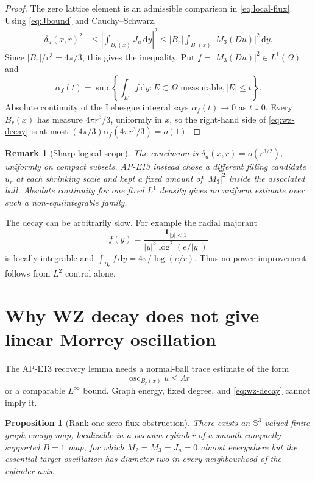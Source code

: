 \documentclass[11pt]{article}
\newtheorem{proposition}[theorem]{Proposition}
\newtheorem{remark}[theorem]{Remark}
\newcommand{\dd}{\,\mathrm d}
\newcommand{\SSS}{\mathbb S}
\newcommand{\osc}{\operatorname{osc}}
\begin{document}
\begin{proof}
The zero lattice element is an admissible comparison in \eqref{eq:local-flux}.
Using \eqref{eq:Jbound} and Cauchy--Schwarz,
\begin{align}
 \delta_u(x,r)^2
 &\leq\left|\int_{B_r(x)}J_u\dd y\right|^2
 \leq |B_r|\int_{B_r(x)}|M_3(Du)|^2\dd y.       \label{eq:wz-cs}
\end{align}
Since $|B_r|/r^3=4\pi/3$, this gives the inequality.  Put
$f=|M_3(Du)|^2\in L^1(\Omega)$ and
\[
 \alpha_f(t)=\sup\left\{\int_E f\dd y:E\subset\Omega\text{ measurable},
 |E|\leq t\right\}.
\]
Absolute continuity of the Lebesgue integral says $\alpha_f(t)\to0$ as
$t\downarrow0$.  Every $B_r(x)$ has measure $4\pi r^3/3$, uniformly in $x$,
so the right-hand side of \eqref{eq:wz-decay} is at most
$(4\pi/3)\alpha_f(4\pi r^3/3)=o(1)$.
\end{proof}

\begin{remark}[Sharp logical scope]
The conclusion is $\delta_u(x,r)=o(r^{3/2})$, uniformly on compact subsets.
AP-E13 instead chose a different filling candidate $u_r$ at each shrinking
scale and kept a fixed amount of $|M_3|^2$ inside the associated ball.
Absolute continuity for one fixed $L^1$ density gives no uniform estimate
over such a non-equiintegrable family.
\end{remark}

The decay can be arbitrarily slow.  For example the radial majorant
\begin{equation}
 f(y)=\frac{\mathbf1_{|y|<1}}{|y|^3\log^2(e/|y|)}
 \label{eq:slow-density}
\end{equation}
is locally integrable and
$\int_{B_r}f\dd y=4\pi/\log(e/r)$.  Thus no power improvement follows from
$L^2$ control alone.

\section{Why WZ decay does not give linear Morrey oscillation}

The AP-E13 recovery lemma needs a normal-ball trace estimate of the form
\begin{equation}
 \osc_{B_r(x)}u\leq \Lambda r
 \label{eq:linear-morrey}
\end{equation}
or a comparable $L^\infty$ bound.  Graph energy, fixed degree, and
\eqref{eq:wz-decay} cannot imply it.

\begin{proposition}[Rank-one zero-flux obstruction]
There exists an $\SSS^3$-valued finite graph-energy map, localizable in a
vacuum cylinder of a smooth compactly supported $B=1$ map, for which
$M_2=M_3=J_u=0$ almost everywhere but the essential target oscillation has
diameter two in every neighbourhood of the cylinder axis.
\end{proposition}
\end{document}
